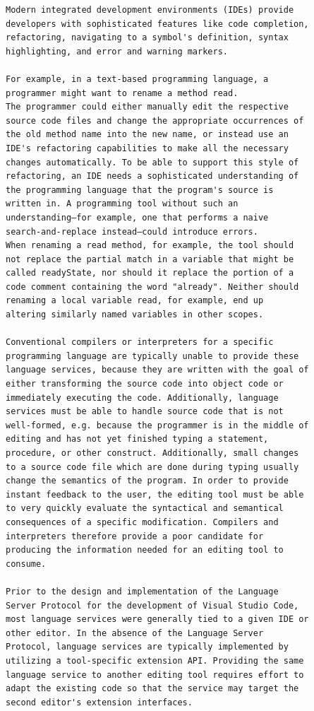 \documentclass[12pt, a4paper]{report}
\begin{document}
\begin{verbatim}
Modern integrated development environments (IDEs) provide
developers with sophisticated features like code completion,
refactoring, navigating to a symbol's definition, syntax
highlighting, and error and warning markers.

For example, in a text-based programming language, a
programmer might want to rename a method read.
The programmer could either manually edit the respective
source code files and change the appropriate occurrences of
the old method name into the new name, or instead use an
IDE's refactoring capabilities to make all the necessary
changes automatically. To be able to support this style of
refactoring, an IDE needs a sophisticated understanding of
the programming language that the program's source is
written in. A programming tool without such an
understanding—for example, one that performs a naive
search-and-replace instead—could introduce errors.
When renaming a read method, for example, the tool should
not replace the partial match in a variable that might be
called readyState, nor should it replace the portion of a
code comment containing the word "already". Neither should
renaming a local variable read, for example, end up
altering similarly named variables in other scopes.

Conventional compilers or interpreters for a specific
programming language are typically unable to provide these
language services, because they are written with the goal of
either transforming the source code into object code or
immediately executing the code. Additionally, language
services must be able to handle source code that is not
well-formed, e.g. because the programmer is in the middle of
editing and has not yet finished typing a statement,
procedure, or other construct. Additionally, small changes
to a source code file which are done during typing usually
change the semantics of the program. In order to provide
instant feedback to the user, the editing tool must be able
to very quickly evaluate the syntactical and semantical
consequences of a specific modification. Compilers and
interpreters therefore provide a poor candidate for
producing the information needed for an editing tool to
consume.

Prior to the design and implementation of the Language
Server Protocol for the development of Visual Studio Code,
most language services were generally tied to a given IDE or
other editor. In the absence of the Language Server
Protocol, language services are typically implemented by
utilizing a tool-specific extension API. Providing the same
language service to another editing tool requires effort to
adapt the existing code so that the service may target the
second editor's extension interfaces.


\end{verbatim}
\end{document}
